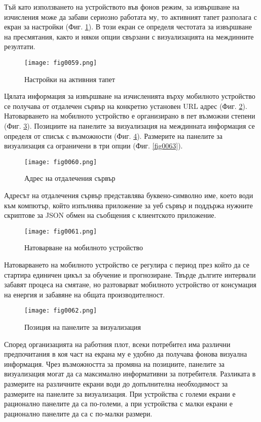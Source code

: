 Тъй като използването на устройството във фонов режим, за извършване на изчисления може да забави сериозно работата му, то активният тапет разполага с екран за настройки (Фиг. \ref{fig0059}). В този екран се определя честотата за извършване на пресмятания, както и някои опции свързани с визуализацията на междинните резултати. 

\begin{figure}[H]
  \centering
  \texttt{[image: fig0059.png]}
  \caption{Настройки на активния тапет}
\label{fig0059}
\end{figure}

Цялата информация за извършване на изчисленията върху мобилното устройство се получава от отдалечен сървър на конкретно установен URL адрес (Фиг. \ref{fig0060}). Натоварването на мобилното устройство е организирано в пет възможни степени (Фиг. \ref{fig0061}). Позициите на панелите за визуализация на междинната информация се определя от списък с възможности (Фиг. \ref{fig0062}). Размерите на панелите за визуализация са ограничени в три опции (Фиг. \ref{fig0063}).

\begin{figure}[H]
  \centering
  \texttt{[image: fig0060.png]}
  \caption{Адрес на отдалечения сървър}
\label{fig0060}
\end{figure}

Адресът на отдалечения сървър представлява буквено-символно име, което води към компютър, който изпълнява приложение за уеб сървър и поддържа нужните скриптове за JSON обмен на съобщения с клиентското приложение.

\begin{figure}[H]
  \centering
  \texttt{[image: fig0061.png]}
  \caption{Натоварване на мобилното устройство}
\label{fig0061}
\end{figure}

Натоварването на мобилното устройство се регулира с период през който да се стартира единичен цикъл за обучение и прогнозиране. Твърде дългите интервали забавят процеса на смятане, но разтоварват мобилното устройство от консумация на енергия и забавяне на общата производителност.

\begin{figure}[H]
  \centering
  \texttt{[image: fig0062.png]}
  \caption{Позиция на панелите за визуализация}
\label{fig0062}
\end{figure}

Според организацията на работния плот, всеки потребител има различни предпочитания в коя част на екрана му е удобно да получава фонова визуална информация. Чрез възможността за промяна на позициите, панелите за визуализация могат да са максимално информативни за потребителя. Разликата в размерите на различните екрани води до допълнителна необходимост за размерите на панелите за визуализация. При устройства с големи екрани е рационално панелите да са по-големи, а при устройства с малки екрани е рационално панелите да са с по-малки размери. 

